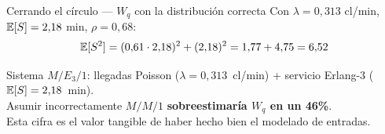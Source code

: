 \documentclass[aspectratio=1610, 10pt]{beamer}
\begin{document}
\begin{frame}{Cerrando el círculo — $W_q$ con la distribución correcta}
  Con $\lambda=0{,}313$ cl/min, $\mathbb{E}[S]=2{,}18$ min, $\rho=0{,}68$:
  \[
    \mathbb{E}[S^2] = (0{,}61\cdot 2{,}18)^2 + (2{,}18)^2 = 1{,}77 + 4{,}75 = 6{,}52
  \]

  \begin{center}
  \end{center}

  \begin{resultadobox}
    Sistema $M/E_3/1$: llegadas Poisson ($\lambda=0{,}313$~cl/min) + servicio Erlang-3 ($\mathbb{E}[S]=2{,}18$~min). \\
    Asumir incorrectamente $M/M/1$ \textbf{sobreestimaría $W_q$ en un 46\%}.
    \\[2pt]
    Esta cifra es el valor tangible de haber hecho bien el modelado de entradas.
  \end{resultadobox}
\end{frame}

\end{document}
